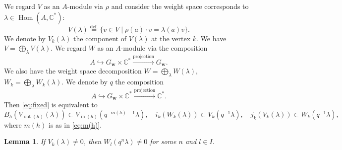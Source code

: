 \documentclass[12pt]{amsart}
\def\Bbb{\mathbb}
\newtheorem{Lemma}[equation]{Lemma}
\theoremstyle{definition}
\theoremstyle{remark}
\numberwithin{equation}{subsection}
\newcommand{\defeq}{\overset{\operatorname{\scriptstyle def.}}{=}}
\newcommand{\C}{{\Bbb C}}
\newcommand{\Hom}{\operatorname{Hom}}
\newcommand{\vin}{\operatorname{in}} %
\newcommand{\vout}{\operatorname{out}} %
\newcommand{\bw}{{\mathbf w}} %
\begin{document}
We regard $V$ as an $A$-module via $\rho$ and consider
the weight space corresponds to $\lambda\in \Hom(A,\C^*)$:
\begin{equation*}
V(\lambda) \defeq \{ v\in V\mid \rho(a)\cdot v = \lambda(a)v \}.
\end{equation*}
We denote by $V_k(\lambda)$ the component of $V(\lambda)$ at the
vertex $k$. We have $V = \bigoplus_\lambda V(\lambda)$.
%
We regard $W$ as an $A$-module via the composition
\begin{equation*}
   A \hookrightarrow G_\bw\times\C^* \xrightarrow{\text{projection}} G_\bw.
\end{equation*}
We also have the weight space decomposition
$W = \bigoplus_\lambda W(\lambda)$, $W_k =\bigoplus_\lambda W_k(\lambda)$.
%
We denote by $q$ the composition
\begin{equation*}
   A \hookrightarrow G_\bw\times\C^* \xrightarrow{\text{projection}} \C^*.  
\end{equation*}
Then \eqref{eq:fixed} is equivalent to
\begin{equation}\label{eq:wtmove}
B_{h}(V_{\vout(h)}(\lambda)) \subset
             V_{\vin(h)}(q^{-m(h)-1}\lambda), \quad 
i_k(W_k(\lambda)) \subset V_k(q^{-1}\lambda),\quad
   j_k(V_k(\lambda)) \subset W_k(q^{-1}\lambda),
\end{equation}
where $m(h)$ is as in \eqref{eq:m(h)}.

\begin{Lemma}\label{lem:Vwei}
If $V_k(\lambda)\neq 0$, then $W_l(q^n\lambda)\neq 0$ for some 
$n$ and $l\in I$.
\end{Lemma}
\end{document}

